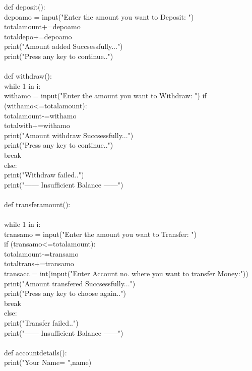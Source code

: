 \documentclass[12pt,a4 paper]{article}
\begin{document}
def deposit():\\
    depoamo = input("Enter the amount you want to Deposit: ")\\
    totalamount+=depoamo\\
    totaldepo+=depoamo\\
    print("Amount added Succsessfully...")\\
    print("Press any key to continue..")\\
\\
def withdraw():\\
  while 1 in i:\\
    withamo = input("Enter the amount you want to Withdraw: ")
    if (withamo<=totalamount):\\
        totalamount-=withamo\\
        totalwith+=withamo\\
        print("Amount withdraw Succsessfully...")\\
        print("Press any key to continue..")\\
        break\\
    else:\\ 
        print("Withdraw failed..")\\
        print("------ Insufficient Balance ------")\\
\\
def transferamount():\\
     \\
    while 1 in i:\\
      transamo = input("Enter the amount you want to Transfer: ")\\
      if (transamo<=totalamount):\\
        totalamount-=transamo\\
        totaltrans+=transamo\\
        transacc = int(input("Enter Account no. where you want to transfer Money:"))\\
        print("Amount transfered Succsessfully...")\\
        print("Press any key to choose again..")\\
        break\\
      else:\\
        print("Transfer failed..")\\
        print("------ Insufficient Balance ------")\\
\\
def accountdetails():\\
	print("Your Name= ",name)\\
\end{document}
